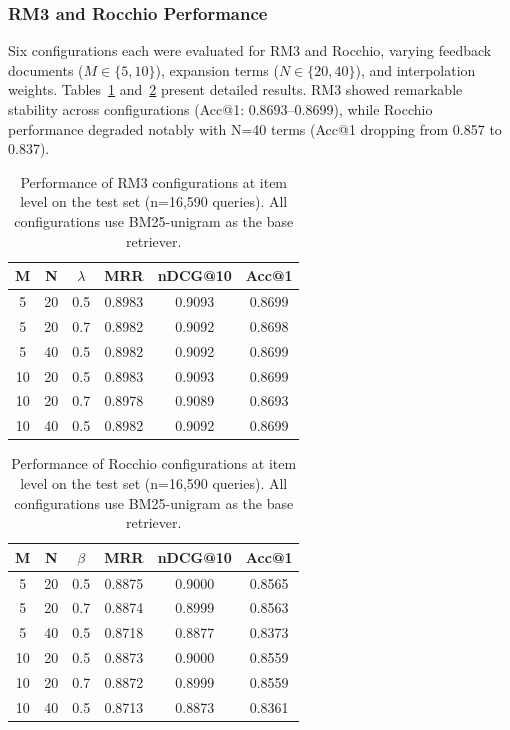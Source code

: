 \documentclass[preprint,12pt]{elsarticle}
\begin{document}
\subsubsection{RM3 and Rocchio Performance}

Six configurations each were evaluated for RM3 and Rocchio, varying feedback documents ($M \in \{5, 10\}$), expansion terms ($N \in \{20, 40\}$), and interpolation weights. Tables~\ref{tab:rm3_configurations} and~\ref{tab:rocchio_configurations} present detailed results. RM3 showed remarkable stability across configurations (Acc@1: 0.8693--0.8699), while Rocchio performance degraded notably with N=40 terms (Acc@1 dropping from 0.857 to 0.837).

\begin{table}[htbp]
\centering
\caption{Performance of RM3 configurations at item level on the test set (n=16,590 queries). All configurations use BM25-unigram as the base retriever.}
\label{tab:rm3_configurations}
\begin{tabular}{cccccc}
\toprule
M & N & $\lambda$ & MRR & nDCG@10 & Acc@1 \\
\midrule
5 & 20 & 0.5 & 0.8983 & 0.9093 & 0.8699 \\
5 & 20 & 0.7 & 0.8982 & 0.9092 & 0.8698 \\
5 & 40 & 0.5 & 0.8982 & 0.9092 & 0.8699 \\
10 & 20 & 0.5 & 0.8983 & 0.9093 & 0.8699 \\
10 & 20 & 0.7 & 0.8978 & 0.9089 & 0.8693 \\
10 & 40 & 0.5 & 0.8982 & 0.9092 & 0.8699 \\
\bottomrule
\end{tabular}
\end{table}

\begin{table}[htbp]
\centering
\caption{Performance of Rocchio configurations at item level on the test set (n=16,590 queries). All configurations use BM25-unigram as the base retriever.}
\label{tab:rocchio_configurations}
\begin{tabular}{cccccc}
\toprule
M & N & $\beta$ & MRR & nDCG@10 & Acc@1 \\
\midrule
5 & 20 & 0.5 & 0.8875 & 0.9000 & 0.8565 \\
5 & 20 & 0.7 & 0.8874 & 0.8999 & 0.8563 \\
5 & 40 & 0.5 & 0.8718 & 0.8877 & 0.8373 \\
10 & 20 & 0.5 & 0.8873 & 0.9000 & 0.8559 \\
10 & 20 & 0.7 & 0.8872 & 0.8999 & 0.8559 \\
10 & 40 & 0.5 & 0.8713 & 0.8873 & 0.8361 \\
\bottomrule
\end{tabular}
\end{table}
\end{document}
